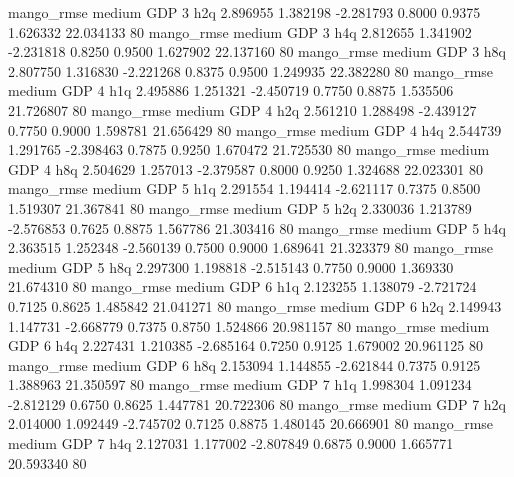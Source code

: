        mango_rmse     medium      GDP                 3                  h2q  2.896955 1.382198 -2.281793 0.8000 0.9375  1.626332   22.034133 80
       mango_rmse     medium      GDP                 3                  h4q  2.812655 1.341902 -2.231818 0.8250 0.9500  1.627902   22.137160 80
       mango_rmse     medium      GDP                 3                  h8q  2.807750 1.316830 -2.221268 0.8375 0.9500  1.249935   22.382280 80
       mango_rmse     medium      GDP                 4                  h1q  2.495886 1.251321 -2.450719 0.7750 0.8875  1.535506   21.726807 80
       mango_rmse     medium      GDP                 4                  h2q  2.561210 1.288498 -2.439127 0.7750 0.9000  1.598781   21.656429 80
       mango_rmse     medium      GDP                 4                  h4q  2.544739 1.291765 -2.398463 0.7875 0.9250  1.670472   21.725530 80
       mango_rmse     medium      GDP                 4                  h8q  2.504629 1.257013 -2.379587 0.8000 0.9250  1.324688   22.023301 80
       mango_rmse     medium      GDP                 5                  h1q  2.291554 1.194414 -2.621117 0.7375 0.8500  1.519307   21.367841 80
       mango_rmse     medium      GDP                 5                  h2q  2.330036 1.213789 -2.576853 0.7625 0.8875  1.567786   21.303416 80
       mango_rmse     medium      GDP                 5                  h4q  2.363515 1.252348 -2.560139 0.7500 0.9000  1.689641   21.323379 80
       mango_rmse     medium      GDP                 5                  h8q  2.297300 1.198818 -2.515143 0.7750 0.9000  1.369330   21.674310 80
       mango_rmse     medium      GDP                 6                  h1q  2.123255 1.138079 -2.721724 0.7125 0.8625  1.485842   21.041271 80
       mango_rmse     medium      GDP                 6                  h2q  2.149943 1.147731 -2.668779 0.7375 0.8750  1.524866   20.981157 80
       mango_rmse     medium      GDP                 6                  h4q  2.227431 1.210385 -2.685164 0.7250 0.9125  1.679002   20.961125 80
       mango_rmse     medium      GDP                 6                  h8q  2.153094 1.144855 -2.621844 0.7375 0.9125  1.388963   21.350597 80
       mango_rmse     medium      GDP                 7                  h1q  1.998304 1.091234 -2.812129 0.6750 0.8625  1.447781   20.722306 80
       mango_rmse     medium      GDP                 7                  h2q  2.014000 1.092449 -2.745702 0.7125 0.8875  1.480145   20.666901 80
       mango_rmse     medium      GDP                 7                  h4q  2.127031 1.177002 -2.807849 0.6875 0.9000  1.665771   20.593340 80
